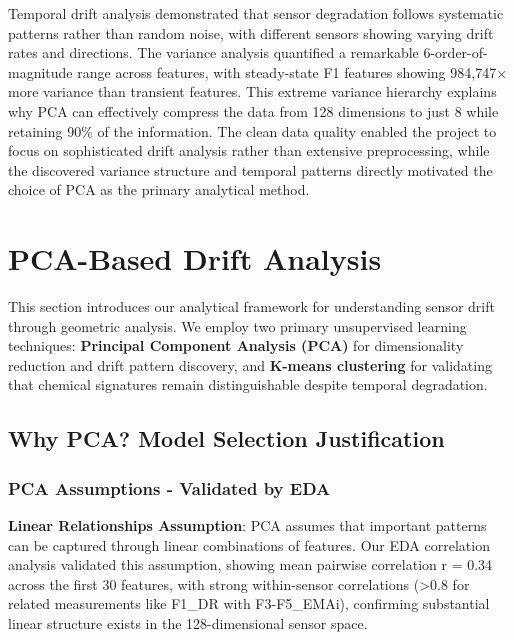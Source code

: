 \documentclass[
  letterpaper,
  DIV=11,
  numbers=noendperiod]{scrartcl}
\begin{document}
Temporal drift analysis demonstrated that sensor degradation follows
systematic patterns rather than random noise, with different sensors
showing varying drift rates and directions. The variance analysis
quantified a remarkable 6-order-of-magnitude range across features, with
steady-state F1 features showing 984,747× more variance than transient
features. This extreme variance hierarchy explains why PCA can
effectively compress the data from 128 dimensions to just 8 while
retaining 90\% of the information. The clean data quality enabled the
project to focus on sophisticated drift analysis rather than extensive
preprocessing, while the discovered variance structure and temporal
patterns directly motivated the choice of PCA as the primary analytical
method.

\section{PCA-Based Drift Analysis}\label{pca-based-drift-analysis}

This section introduces our analytical framework for understanding
sensor drift through geometric analysis. We employ two primary
unsupervised learning techniques: \textbf{Principal Component Analysis
(PCA)} for dimensionality reduction and drift pattern discovery, and
\textbf{K-means clustering} for validating that chemical signatures
remain distinguishable despite temporal degradation.

\subsection{Why PCA? Model Selection
Justification}\label{why-pca-model-selection-justification}

\subsubsection{PCA Assumptions - Validated by
EDA}\label{pca-assumptions---validated-by-eda}

\textbf{Linear Relationships Assumption}: PCA assumes that important
patterns can be captured through linear combinations of features. Our
EDA correlation analysis validated this assumption, showing mean
pairwise correlation \textbar r\textbar{} = 0.34 across the first 30
features, with strong within-sensor correlations (\textgreater0.8 for
related measurements like F1\_DR with F3-F5\_EMAi), confirming
substantial linear structure exists in the 128-dimensional sensor space.
\end{document}
